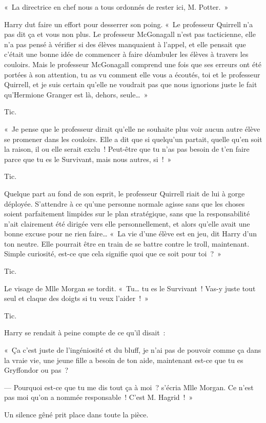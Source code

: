 «~La directrice en chef nous a tous ordonnés de rester ici, M. Potter.~»

Harry dut faire un effort pour desserrer son poing.
«~Le professeur Quirrell n'a pas dit ça et vous non plus.
Le professeur McGonagall n'est pas tacticienne, elle n'a pas pensé à vérifier si des élèves manquaient à l'appel, et elle pensait que c'était une bonne idée de commencer à faire déambuler les élèves à travers les couloirs.
Mais le professeur McGonagall comprend une fois que ses erreurs ont été portées à son attention, tu as vu comment elle vous a écoutés, toi et le professeur Quirrell, et je suis certain qu'elle ne voudrait pas que nous ignorions juste le fait qu'Hermione Granger est là, dehors, seule…~»

Tic.

«~Je pense que le professeur dirait qu'elle ne souhaite plus voir aucun autre élève se promener dans les couloirs.
Elle a dit que si quelqu'un partait, quelle qu'en soit la raison, il ou elle serait exclu~!
Peut-être que tu n'as pas besoin de t'en faire parce que tu es le Survivant, mais nous autres, si~!~»

Tic.

Quelque part au fond de son esprit, le professeur Quirrell riait de lui à gorge déployée.
S'attendre à ce qu'une personne normale agisse sans que les choses soient parfaitement limpides sur le plan stratégique, sans que la responsabilité n'ait clairement été dirigée vers elle personnellement, et alors qu'elle avait une bonne excuse pour ne rien faire…
«~La vie d'une élève est en jeu, dit Harry d'un ton neutre.
Elle pourrait être en train de se battre contre le troll, maintenant.
Simple curiosité, est-ce que cela signifie quoi que ce soit pour toi~?~»

Tic.

Le visage de Mlle Morgan se tordit.
«~Tu… tu es le Survivant~!
Vas-y juste tout seul et claque des doigts si tu veux l'aider~!~»

Tic.

Harry se rendait à peine compte de ce qu'il disait~:

«~Ça c'est juste de l'ingéniosité et du bluff, je n'ai pas de pouvoir comme ça dans la vraie vie, une jeune fille a besoin de ton aide, maintenant est-ce que tu es Gryffondor ou pas~?

--- Pourquoi est-ce que tu me dis tout ça à moi~? s'écria Mlle Morgan.
Ce n'est pas moi qu'on a nommée responsable~!
C'est M. Hagrid~!~»

Un silence gêné prit place dans toute la pièce.

